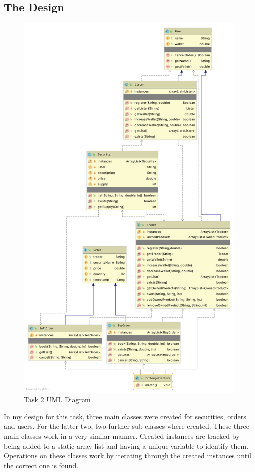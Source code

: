 \documentclass[a4paper, 12pt]{report}
\begin{document}
\subsection{The Design}
\begin{figure}[H]
    \centering
    \includegraphics[width=\textwidth,height=\textheight,keepaspectratio]{"UML 2"}
    \caption{Task 2 UML Diagram}
\end{figure}

In my design for this task, three main classes were created for securities, orders and users. For the latter two, two further sub classes where created. These three main classes work in a very similar manner. Created instances are tracked by being added to a static array list and having a unique variable to identify them. Operations on these classes work by iterating through the created instances until the correct one is found.
\end{document}
